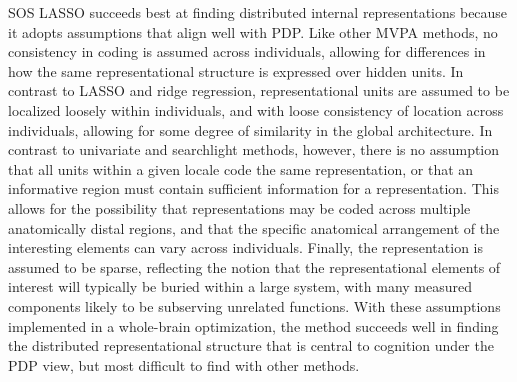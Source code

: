 SOS LASSO succeeds best at finding distributed internal representations because it adopts assumptions that align well with PDP. Like other MVPA methods, no consistency in coding is assumed across individuals, allowing for differences in how the same representational structure is expressed over hidden units. In contrast to LASSO and ridge regression, representational units are assumed to be localized loosely within individuals, and with loose consistency of location across individuals, allowing for some degree of similarity in the global architecture. In contrast to univariate and searchlight methods, however, there is no assumption that all units within a given locale code the same representation, or that an informative region must contain sufficient information for a representation. This allows for the possibility that representations may be coded across multiple anatomically distal regions, and that the specific anatomical arrangement of the interesting elements can vary across individuals. Finally, the representation is assumed to be sparse, reflecting the notion that the representational elements of interest will typically be buried within a large system, with many measured components likely to be subserving unrelated functions. With these assumptions implemented in a whole-brain optimization, the method succeeds well in finding the distributed representational structure that is central to cognition under the PDP view, but most difficult to find with other methods.

